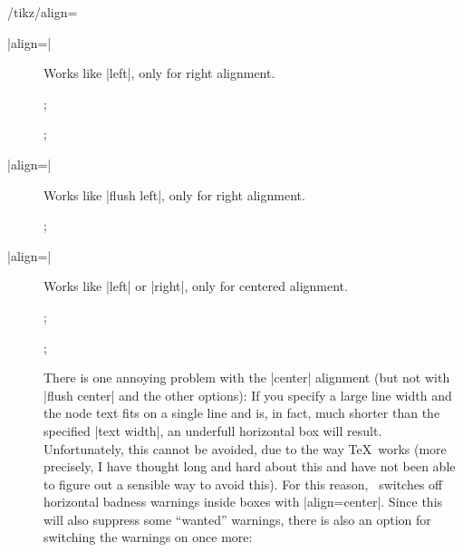\begin{key}{/tikz/align=}
\begin{description}
  \item[|align=|]
    Works like |left|, only for right alignment.
\begin{codeexample}[]
\tikz {};
\end{codeexample}
\begin{codeexample}[]
\tikz {};
\end{codeexample}

  \item[|align=|]
    Works like |flush left|, only for right alignment.
\begin{codeexample}[]
\tikz {};
\end{codeexample}

  \item[|align=|]
    Works like |left| or |right|, only for centered alignment.
\begin{codeexample}[]
\tikz {};
\end{codeexample}
\begin{codeexample}[]
\tikz {};
\end{codeexample}

    There is one annoying problem with the |center|
    alignment (but not with |flush center| and the other options): If
    you specify a large line width and the node text  
    fits on a single line and is, in fact, much shorter than the
    specified |text width|, an underfull horizontal box will
    result. Unfortunately, this cannot be avoided, due to the way
    \TeX\ works (more precisely, I have thought long and hard about this
    and have not been able to figure out a sensible way to avoid this).
    For this reason, \tikzname\ switches off horizontal badness
    warnings inside boxes with |align=center|. Since this will also
    suppress some ``wanted'' warnings, there is also an option for
    switching the warnings on once more:


\end{description}
\end{key}
